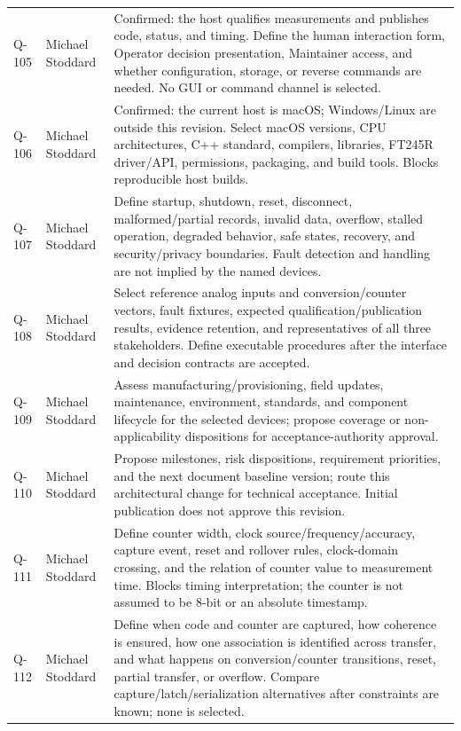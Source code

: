 \begin{tabularx}{\linewidth}{L{1.3cm}L{3.1cm}Y}
\label{Question:Q-105}Q-105 & Michael Stoddard & Confirmed: the host qualifies measurements and publishes code, status, and timing. Define the human interaction form, Operator decision presentation, Maintainer access, and whether configuration, storage, or reverse commands are needed. No GUI or command channel is selected.\\
\label{Question:Q-106}Q-106 & Michael Stoddard & Confirmed: the current host is macOS; Windows/Linux are outside this revision. Select macOS versions, CPU architectures, C++ standard, compilers, libraries, FT245R driver/API, permissions, packaging, and build tools. Blocks reproducible host builds.\\
\label{Question:Q-107}Q-107 & Michael Stoddard & Define startup, shutdown, reset, disconnect, malformed/partial records, invalid data, overflow, stalled operation, degraded behavior, safe states, recovery, and security/privacy boundaries. Fault detection and handling are not implied by the named devices.\\
\label{Question:Q-108}Q-108 & Michael Stoddard & Select reference analog inputs and conversion/counter vectors, fault fixtures, expected qualification/publication results, evidence retention, and representatives of all three stakeholders. Define executable procedures after the interface and decision contracts are accepted.\\
\label{Question:Q-109}Q-109 & Michael Stoddard & Assess manufacturing/provisioning, field updates, maintenance, environment, standards, and component lifecycle for the selected devices; propose coverage or non-applicability dispositions for acceptance-authority approval.\\
\label{Question:Q-110}Q-110 & Michael Stoddard & Propose milestones, risk dispositions, requirement priorities, and the next document baseline version; route this architectural change for technical acceptance. Initial publication does not approve this revision.\\
\label{Question:Q-111}Q-111 & Michael Stoddard & Define counter width, clock source/frequency/accuracy, capture event, reset and rollover rules, clock-domain crossing, and the relation of counter value to measurement time. Blocks timing interpretation; the counter is not assumed to be 8-bit or an absolute timestamp.\\
\label{Question:Q-112}Q-112 & Michael Stoddard & Define when code and counter are captured, how coherence is ensured, how one association is identified across transfer, and what happens on conversion/counter transitions, reset, partial transfer, or overflow. Compare capture/latch/serialization alternatives after constraints are known; none is selected.\\

\end{tabularx}
